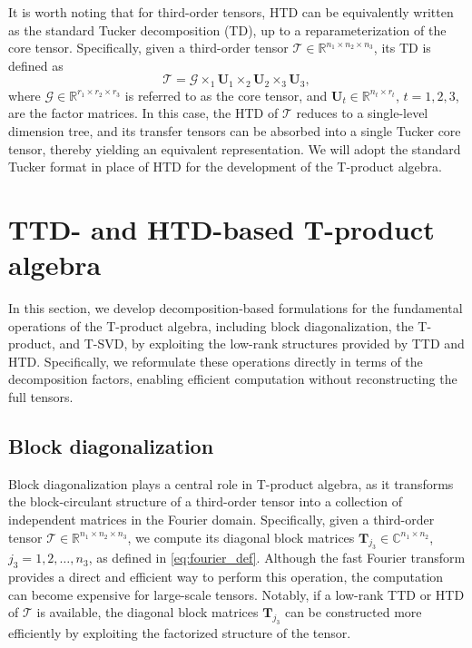 \documentclass[onefignum,onetabnum]{siamart250211}
\begin{document}
It is worth noting that for third-order tensors, HTD can be equivalently written as the standard Tucker decomposition (TD), up to a reparameterization of the core tensor. Specifically, given a third-order tensor $\mathscr{T}\in\mathbb{R}^{n_1\times n_2\times n_3}$, its TD  is defined as
\begin{equation*}
    \mathscr{T}= \mathscr{G}\times_1\textbf{U}_1\times_2\textbf{U}_2\times_3 \textbf{U}_3,
\end{equation*}
where $\mathscr{G}\in\mathbb{R}^{r_1\times r_2\times r_3}$ is referred to as the core tensor, and $\textbf{U}_t\in\mathbb{R}^{n_t\times r_t}$, $t=1,2,3$, are the factor matrices. In this case, the HTD of $\mathscr{T}$ reduces to a single-level dimension tree, and its transfer tensors can be absorbed into a single Tucker core tensor, thereby yielding an equivalent representation. We will adopt the standard Tucker format in place of HTD for the development of the T-product algebra.


\section{TTD- and HTD-based T-product algebra}\label{sec:3rdoperation}
In this section, we develop decomposition-based formulations for the fundamental operations of the T-product algebra, including block diagonalization, the T-product, and T-SVD, by exploiting the low-rank structures provided by TTD and HTD. Specifically, we reformulate these operations directly in terms of the decomposition factors,  enabling efficient computation without reconstructing the full tensors.

\subsection{Block diagonalization}
Block diagonalization plays a central role in T-product algebra, as it transforms the block-circulant structure of a third-order tensor into a collection of independent matrices in the Fourier domain. Specifically, given a third-order tensor $\mathscr{T}\in\mathbb{R}^{n_1\times n_2\times n_3}$, we compute its diagonal block  matrices $\textbf{T}_{j_3}\in\mathbb{C}^{n_1\times n_2}$, $j_3=1,2,\dots,n_3$, as defined in \cref{eq:fourier_def}. Although the fast Fourier transform provides a direct and efficient way to perform this operation, the computation can become expensive for large-scale tensors. Notably, if a low-rank TTD or HTD of $\mathscr{T}$ is available, the diagonal block matrices $\textbf{T}_{j_3}$ can be constructed more efficiently by exploiting the factorized structure of the tensor.
\end{document}
